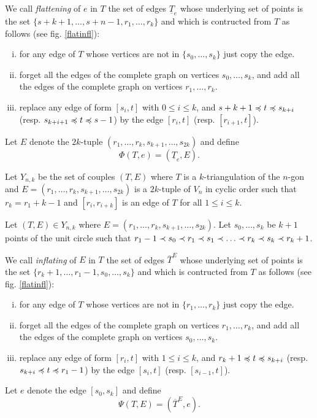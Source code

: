 \documentclass[12pt]{amsart}
\begin{document}
We call \emph{flattening} of $e$ in $T$ the set of edges $\underline{T}_e$ whose underlying set of points is the set $\{s+k+1,\ldots,s+n-1,r_1,\ldots,r_k\}$ and which is contructed from $T$ as follows (see fig. \ref{flatinfl}):
\begin{enumerate}[(i)]
\item for any edge of $T$ whose vertices are not in $\{s_0,\ldots,s_k\}$ just copy the edge.
\item forget all the edges of the complete graph on vertices $s_0,\ldots,s_k$, and add all the edges of the complete graph on vertices $r_1,\ldots,r_k$.
\item replace any edge of form $[s_i,t]$ with $0\le i\le k$, and $s+k+1\preccurlyeq t \preccurlyeq s_{k+i}$ (resp. $s_{k+i+1}\preccurlyeq t\preccurlyeq s-1$) by the edge $[r_i,t]$ (resp. $[r_{i+1},t]$).
\end{enumerate}
Let $E$ denote the $2k$-tuple $(r_1,\ldots,r_k,s_{k+1},\ldots,s_{2k})$ and define $$\Phi(T,e)=(\underline{T}_e,E).$$

\bigskip
Let $Y_{n,k}$ be the set of couples $(T,E)$ where $T$ is a $k$-triangulation of the $n$-gon and $E=(r_1,\ldots,r_k,s_{k+1},\ldots,s_{2k})$ is a $2k$-tuple of $V_{n}$ in cyclic order such that $r_k=r_1+k-1$ and $[r_i,r_{i+k}]$ is an edge of $T$ for all $1\le i\le k$.

Let $(T,E)\in Y_{n,k}$ where $E=(r_1,\ldots,r_k,s_{k+1},\ldots,s_{2k})$. Let $s_0,\ldots,s_k$ be $k+1$ points of the unit circle such that $r_1-1\prec s_0\prec r_1\prec s_1\prec \ldots\prec r_k\prec s_k\prec r_k+1$.

We call \emph{inflating} of $E$ in $T$ the set of edges $\overline{T}^E$ whose underlying set of points is the set $\{r_k+1,\ldots,r_1-1,s_0,\ldots,s_k\}$ and which is contructed from $T$ as follows (see fig. \ref{flatinfl}):
\begin{enumerate}[(i)]
\item for any edge of $T$ whose vertices are not in $\{r_1,\ldots,r_k\}$ just copy the edge.
\item forget all the edges of the complete graph on vertices $r_1,\ldots,r_k$, and add all the edges of the complete graph on vertices $s_0,\ldots,s_k$.
\item replace any edge of form $[r_i,t]$ with $1\le i\le k$, and $r_k+1\preccurlyeq t \preccurlyeq s_{k+i}$ (resp. $s_{k+i}\preccurlyeq t\preccurlyeq r_1-1$) by the edge $[s_i,t]$ (resp. $[s_{i-1},t]$).
\end{enumerate}
Let $e$ denote the edge $[s_0,s_k]$ and define $$\Psi(T,E)=(\overline{T}^E,e).$$
\end{document}
